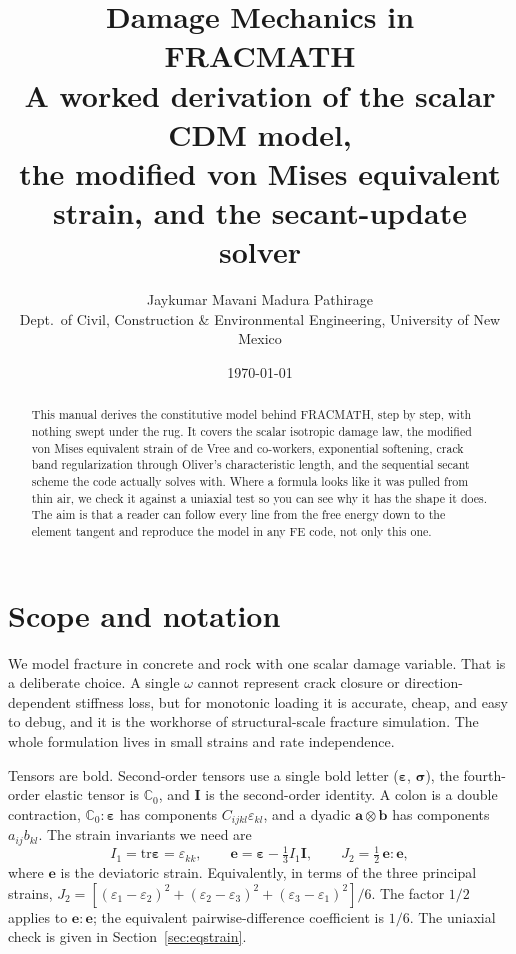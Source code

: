 \documentclass[11pt]{article}
\title{\textbf{Damage Mechanics in FRACMATH}\\[2pt]
\large A worked derivation of the scalar CDM model,\\
the modified von Mises equivalent strain, and the secant-update solver}
\author{Jaykumar Mavani \quad\textbar\quad Madura Pathirage\\
\small Dept.\ of Civil, Construction \& Environmental Engineering, University of New Mexico}
\date{\today}
\newcommand{\eps}{\bm{\varepsilon}}
\newcommand{\sig}{\bm{\sigma}}
\newcommand{\C}{\mathbb{C}}
\newcommand{\Id}{\bm{I}}
\newcommand{\tr}{\mathrm{tr}}
\begin{document}
\maketitle
\thispagestyle{fancy}

\begin{abstract}
\noindent
This manual derives the constitutive model behind FRACMATH, step by step, with nothing
swept under the rug. It covers the scalar isotropic damage law, the modified von Mises
equivalent strain of de Vree and co-workers, exponential softening, crack band
regularization through Oliver's characteristic length, and the sequential secant
scheme the code actually solves with. Where a formula looks like it was pulled from thin
air, we check it against a uniaxial test so you can see why it has the shape it does.
The aim is that a reader can follow every line from the free energy down to the element
tangent and reproduce the model in any FE code, not only this one.
\end{abstract}

\tableofcontents
\bigskip

\section{Scope and notation}

We model fracture in concrete and rock with one scalar damage variable. That is a
deliberate choice. A single $\omega$ cannot represent crack closure or direction-dependent
stiffness loss, but for monotonic loading it is accurate, cheap, and easy to debug, and it
is the workhorse of structural-scale fracture simulation. The whole formulation lives in
small strains and rate independence.

Tensors are bold. Second-order tensors use a single bold letter ($\eps$, $\sig$), the
fourth-order elastic tensor is $\C_0$, and $\Id$ is the second-order identity. A colon is a
double contraction, $\C_0:\eps$ has components $C_{ijkl}\varepsilon_{kl}$, and a dyadic
$\bm a \otimes \bm b$ has components $a_{ij}b_{kl}$. The strain invariants we need are
%
\begin{equation}
I_1 = \tr\eps = \varepsilon_{kk},
\qquad
\bm e = \eps - \tfrac{1}{3} I_1 \Id,
\qquad
J_2 = \tfrac{1}{2}\,\bm e : \bm e ,
\label{eq:invariants}
\end{equation}
%
where $\bm e$ is the deviatoric strain. Equivalently, in terms of the three
principal strains, $J_2=[(\varepsilon_1-\varepsilon_2)^2+
(\varepsilon_2-\varepsilon_3)^2+(\varepsilon_3-\varepsilon_1)^2]/6$.
The factor $1/2$ applies to $\bm e:\bm e$; the equivalent pairwise-difference
coefficient is $1/6$. The
uniaxial check is given in Section~\ref{sec:eqstrain}.
\end{document}

